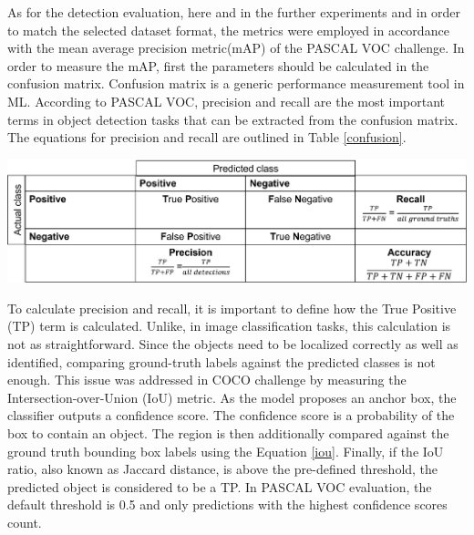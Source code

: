 \documentclass[english, 12pt, a4paper, elec, utf8, a-1b, online]{aaltothesis}
\begin{document}
As for the detection evaluation, here and in the further experiments and in order to match the selected dataset format, the metrics were employed in accordance with the mean average precision metric(mAP) of the PASCAL VOC \cite{Everingham10} challenge. In order to measure the mAP, first the parameters should be calculated in the confusion matrix. Confusion matrix is a generic performance measurement tool in ML. According to PASCAL VOC, precision and recall are the most important terms in object detection tasks that can be extracted from the confusion matrix. The equations for precision and recall are outlined in Table \ref{confusion}.

\begin{table}[htb]
	\begin{center}
		\includegraphics[width=14cm]{./confusion.png}
	\end{center}
	\begin{center}
		\label{confusion}
	\end{center}
\end{table}
\FloatBarrier


To calculate precision and recall, it is important to define how the True Positive (TP) term is calculated. Unlike, in image classification tasks, this calculation is not as straightforward. Since the objects need to be localized correctly as well as identified, comparing ground-truth labels against the predicted classes is not enough. This issue was addressed in COCO challenge \cite{Lin2014} by measuring the Intersection-over-Union (IoU) metric. As the model proposes an anchor box, the classifier outputs a confidence score. The confidence score is a probability of the box to contain an object. The region is then additionally compared against the ground truth bounding box labels using the Equation \ref{iou}. Finally, if the IoU ratio, also known as Jaccard distance, is above the pre-defined threshold, the predicted object is considered to be a TP. In PASCAL VOC evaluation, the default threshold is 0.5 \cite{mAp_blog} and only predictions with the highest confidence scores count. 
\end{document}
